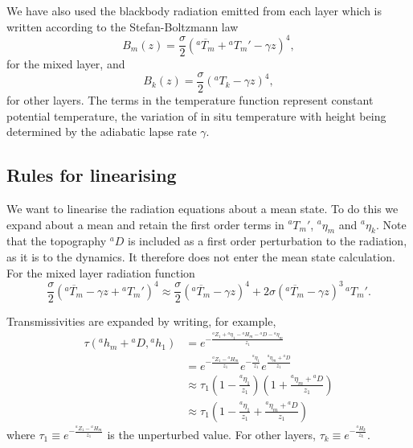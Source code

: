 \documentclass[11pt, a4paper,twoside]{article}
\newcommand{\etb}[2]{{{}^{#1}\eta_{#2}}}
\newcommand{\HH}[2]{{{}^{#1}H_{#2}}}
\newcommand{\Z}[2]{{{}^{#1}Z_{#2}}}
\newcommand{\h}[2]{{{}^{#1}h_{#2}}}
\newcommand{\T}[2]{{{}^{#1}T_{#2}}}
\newcommand{\B}[1]{{B_{#1}}}
\newcommand{\D}[1]{{}^{#1}D}
\numberwithin{equation}{section}
\begin{document}
We have also used the blackbody radiation emitted from each layer which is written according to the Stefan-Boltzmann law
\begin{equation}
\B{m}(z) = \frac{\sigma}{2}(\overline{\T{a}{m}}  + \T{a}{m}' - \gamma z)^4,
\end{equation}
for the mixed layer, and
\begin{equation}
\B{k}(z) = \frac{\sigma}{2}(\T{a}{k} - \gamma z)^4,
\end{equation}
for other layers.
The terms in the temperature function represent constant potential temperature, the variation of in situ temperature with height being determined by the adiabatic lapse rate $\gamma$.

\subsection{Rules for linearising}
We want to linearise the radiation equations about a mean state.
To do this we expand about a mean and retain the first order terms in $\T{a}{m}'$, $\etb{a}{m}$ and $\etb{a}{k}$.
Note that the topography $\D{a}$ is included as a first order perturbation to the radiation, as it is to the dynamics.
It therefore does not enter the mean state calculation.
For the mixed layer radiation function
\begin{equation}
\frac{\sigma}{2}(\overline{\T{a}{m}} - \gamma z + \T{a}{m}')^4 \approx \frac{\sigma}{2}(\overline{\T{a}{m}} - \gamma z)^4 + 2\sigma(\overline{\T{a}{m}} - \gamma z)^3 \, \T{a}{m}'.
\end{equation}

Transmissivities are expanded by writing, for example,
\begin{equation}
\begin{split}
\tau(\h{a}{m}+\D{a},\h{a}{1}) &= e^{-\frac{\Z{a}{1} + \etb{a}{1} -\HH{a}{m} -\D{a} - \etb{a}{m}}{z_1}} \\
&= e^{-\frac{\Z{a}{1} -\HH{a}{m}}{z_1}} e^{-\frac{\etb{a}{1}}{z_1}}e^{\frac{\etb{a}{m}+\D{a}}{z_1}}\\
&\approx \tau_1\left(1 -  \frac{\etb{a}{1}}{z_1} \right)\left(1 + \frac{\etb{a}{m}+\D{a}}{z_1} \right)\\
&\approx \tau_1\left(1 -  \frac{\etb{a}{1}}{z_1}  + \frac{\etb{a}{m}+\D{a}}{z_1} \right)
\end{split}
\end{equation}
where $\tau_1 \equiv e^{-\frac{\Z{a}{1}-\HH{a}{m} }{z_1}}$ is the unperturbed value.
For other layers, $\tau_k \equiv e^{-\frac{\HH{a}{k}}{z_k}}$.
\end{document}
